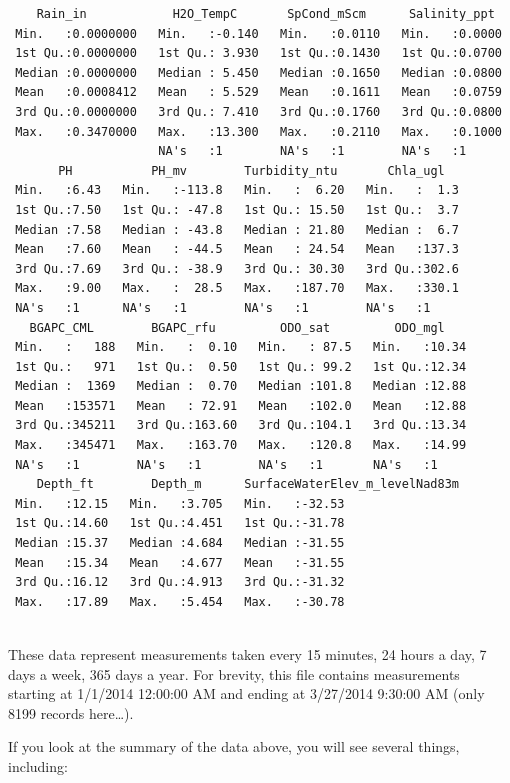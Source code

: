 \documentclass[
  letterpaper,
]{book}
\begin{document}
\begin{verbatim}
    Rain_in            H2O_TempC       SpCond_mScm      Salinity_ppt   
 Min.   :0.0000000   Min.   :-0.140   Min.   :0.0110   Min.   :0.0000  
 1st Qu.:0.0000000   1st Qu.: 3.930   1st Qu.:0.1430   1st Qu.:0.0700  
 Median :0.0000000   Median : 5.450   Median :0.1650   Median :0.0800  
 Mean   :0.0008412   Mean   : 5.529   Mean   :0.1611   Mean   :0.0759  
 3rd Qu.:0.0000000   3rd Qu.: 7.410   3rd Qu.:0.1760   3rd Qu.:0.0800  
 Max.   :0.3470000   Max.   :13.300   Max.   :0.2110   Max.   :0.1000  
                     NA's   :1        NA's   :1        NA's   :1       
       PH           PH_mv        Turbidity_ntu       Chla_ugl    
 Min.   :6.43   Min.   :-113.8   Min.   :  6.20   Min.   :  1.3  
 1st Qu.:7.50   1st Qu.: -47.8   1st Qu.: 15.50   1st Qu.:  3.7  
 Median :7.58   Median : -43.8   Median : 21.80   Median :  6.7  
 Mean   :7.60   Mean   : -44.5   Mean   : 24.54   Mean   :137.3  
 3rd Qu.:7.69   3rd Qu.: -38.9   3rd Qu.: 30.30   3rd Qu.:302.6  
 Max.   :9.00   Max.   :  28.5   Max.   :187.70   Max.   :330.1  
 NA's   :1      NA's   :1        NA's   :1        NA's   :1      
   BGAPC_CML        BGAPC_rfu         ODO_sat         ODO_mgl     
 Min.   :   188   Min.   :  0.10   Min.   : 87.5   Min.   :10.34  
 1st Qu.:   971   1st Qu.:  0.50   1st Qu.: 99.2   1st Qu.:12.34  
 Median :  1369   Median :  0.70   Median :101.8   Median :12.88  
 Mean   :153571   Mean   : 72.91   Mean   :102.0   Mean   :12.88  
 3rd Qu.:345211   3rd Qu.:163.60   3rd Qu.:104.1   3rd Qu.:13.34  
 Max.   :345471   Max.   :163.70   Max.   :120.8   Max.   :14.99  
 NA's   :1        NA's   :1        NA's   :1       NA's   :1      
    Depth_ft        Depth_m      SurfaceWaterElev_m_levelNad83m
 Min.   :12.15   Min.   :3.705   Min.   :-32.53                
 1st Qu.:14.60   1st Qu.:4.451   1st Qu.:-31.78                
 Median :15.37   Median :4.684   Median :-31.55                
 Mean   :15.34   Mean   :4.677   Mean   :-31.55                
 3rd Qu.:16.12   3rd Qu.:4.913   3rd Qu.:-31.32                
 Max.   :17.89   Max.   :5.454   Max.   :-30.78                
                                                               
\end{verbatim}

These data represent measurements taken every 15 minutes, 24 hours a
day, 7 days a week, 365 days a year. For brevity, this file contains
measurements starting at 1/1/2014 12:00:00 AM and ending at 3/27/2014
9:30:00 AM (only 8199 records here\ldots).

If you look at the summary of the data above, you will see several
things, including:
\end{document}

